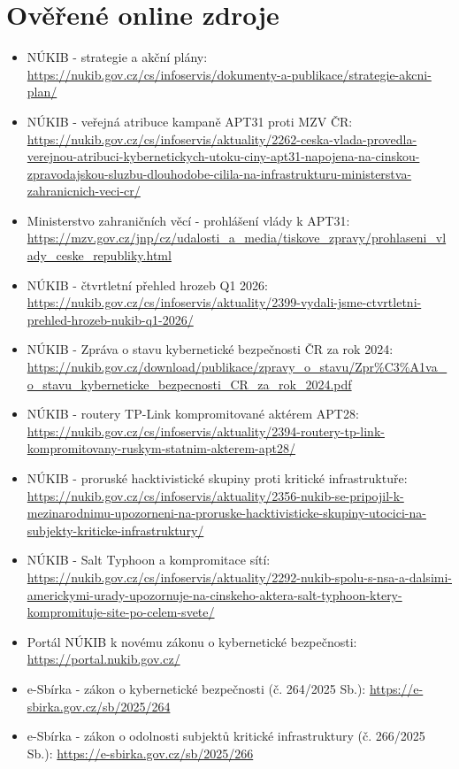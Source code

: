 \section*{Ověřené online zdroje}
\begin{itemize}
  \item NÚKIB - strategie a akční plány: \url{https://nukib.gov.cz/cs/infoservis/dokumenty-a-publikace/strategie-akcni-plan/}
  \item NÚKIB - veřejná atribuce kampaně APT31 proti MZV ČR: \url{https://nukib.gov.cz/cs/infoservis/aktuality/2262-ceska-vlada-provedla-verejnou-atribuci-kybernetickych-utoku-ciny-apt31-napojena-na-cinskou-zpravodajskou-sluzbu-dlouhodobe-cilila-na-infrastrukturu-ministerstva-zahranicnich-veci-cr/}
  \item Ministerstvo zahraničních věcí - prohlášení vlády k APT31: \url{https://mzv.gov.cz/jnp/cz/udalosti_a_media/tiskove_zpravy/prohlaseni_vlady_ceske_republiky.html}
  \item NÚKIB - čtvrtletní přehled hrozeb Q1 2026: \url{https://nukib.gov.cz/cs/infoservis/aktuality/2399-vydali-jsme-ctvrtletni-prehled-hrozeb-nukib-q1-2026/}
  \item NÚKIB - Zpráva o stavu kybernetické bezpečnosti ČR za rok 2024: \url{https://nukib.gov.cz/download/publikace/zpravy_o_stavu/Zpr%C3%A1va_o_stavu_kyberneticke_bezpecnosti_CR_za_rok_2024.pdf}
  \item NÚKIB - routery TP-Link kompromitované aktérem APT28: \url{https://nukib.gov.cz/cs/infoservis/aktuality/2394-routery-tp-link-kompromitovany-ruskym-statnim-akterem-apt28/}
  \item NÚKIB - proruské hacktivistické skupiny proti kritické infrastruktuře: \url{https://nukib.gov.cz/cs/infoservis/aktuality/2356-nukib-se-pripojil-k-mezinarodnimu-upozorneni-na-proruske-hacktivisticke-skupiny-utocici-na-subjekty-kriticke-infrastruktury/}
  \item NÚKIB - Salt Typhoon a kompromitace sítí: \url{https://nukib.gov.cz/cs/infoservis/aktuality/2292-nukib-spolu-s-nsa-a-dalsimi-americkymi-urady-upozornuje-na-cinskeho-aktera-salt-typhoon-ktery-kompromituje-site-po-celem-svete/}
  \item Portál NÚKIB k novému zákonu o kybernetické bezpečnosti: \url{https://portal.nukib.gov.cz/}
  \item e-Sbírka - zákon o kybernetické bezpečnosti (č. 264/2025 Sb.): \url{https://e-sbirka.gov.cz/sb/2025/264}
  \item e-Sbírka - zákon o odolnosti subjektů kritické infrastruktury (č. 266/2025 Sb.): \url{https://e-sbirka.gov.cz/sb/2025/266}

\end{itemize}
